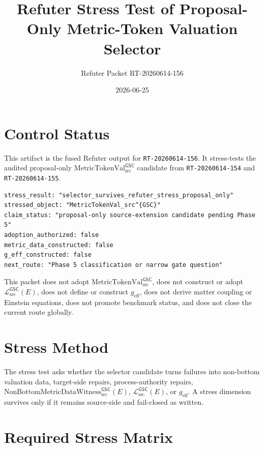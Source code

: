 \documentclass[11pt]{article}
\title{Refuter Stress Test of Proposal-Only Metric-Token Valuation Selector}
\author{Refuter Packet RT-20260614-156}
\date{2026-06-25}
\newcommand{\MetricTokenVal}{\mathrm{MetricTokenVal}_{\mathrm{src}}^{\mathsf{GSC}}}
\newcommand{\MetricData}{\mathcal{L}_{\mathrm{src}}^{\mathsf{GSC}}}
\newcommand{\Witness}{\mathrm{NonBottomMetricDataWitness}_{\mathrm{src}}^{\mathsf{GSC}}}
\newcommand{\geff}{g_{\mathrm{eff}}}
\begin{document}
\maketitle

\section{Control Status}

This artifact is the fused Refuter output for \texttt{RT-20260614-156}. It
stress-tests the audited proposal-only \(\MetricTokenVal\) candidate from
\texttt{RT-20260614-154} and \texttt{RT-20260614-155}.

\begin{verbatim}
stress_result: "selector_survives_refuter_stress_proposal_only"
stressed_object: "MetricTokenVal_src^{GSC}"
claim_status: "proposal-only source-extension candidate pending Phase 5"
adoption_authorized: false
metric_data_constructed: false
g_eff_constructed: false
next_route: "Phase 5 classification or narrow gate question"
\end{verbatim}

This packet does not adopt \(\MetricTokenVal\), does not construct or adopt
\(\MetricData(E)\), does not define or construct \(\geff\), does not derive
matter coupling or Einstein equations, does not promote benchmark status, and
does not close the current route globally.

\section{Stress Method}

The stress test asks whether the selector candidate turns failures into
non-bottom valuation data, target-side repairs, process-authority repairs,
\(\Witness(E)\), \(\MetricData(E)\), or \(\geff\). A stress dimension survives
only if it remains source-side and fail-closed as written.

\section{Required Stress Matrix}
\end{document}
